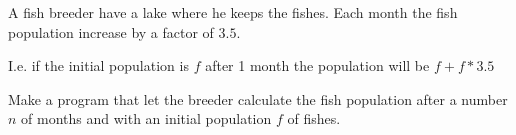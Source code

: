 



\ExamNameLine
\ExamStandardBoxEn
A fish breeder have a lake where he keeps the fishes. Each month the
fish population increase by a factor of $3.5$.

I.e. if the initial population is $f$ after 1 month the population
will be $f+f*3.5$

Make a program that let the breeder calculate the fish population
after a number $n$ of months and with an initial population $f$ of fishes.

